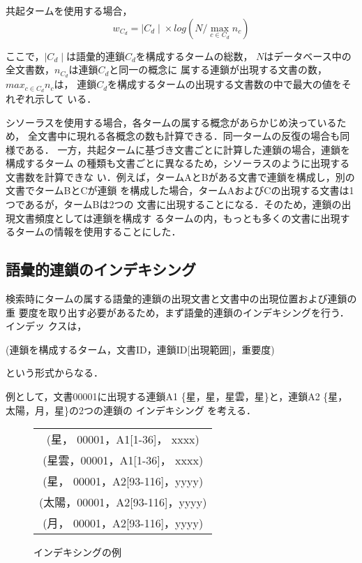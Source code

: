 共起タームを使用する場合，
\begin{equation}\label{equ:cweight_co}
w_{C_d} = {\mid C_{d}\mid}\times 
log(N/\max_{c \in C_{d}} n_{c})
\end{equation}

ここで，$\mid C_d\mid$は語彙的連鎖$C_{d}$を構成するタームの総数，
$N$はデータベース中の全文書数，$n_{C_{d}}$は連鎖$C_{d}$と同一の概念に
属する連鎖が出現する文書の数，$max_{c \in C_{d}} n_{c}$は，
連鎖$C_{d}$を構成するタームの出現する文書数の中で最大の値をそれぞれ示して
いる．

シソーラスを使用する場合，各タームの属する概念があらかじめ決っているため，
全文書中に現れる各概念の数も計算できる．同一タームの反復の場合も同様である．
一方，共起タームに基づき文書ごとに計算した連鎖の場合，連鎖を構成するターム
の種類も文書ごとに異なるため，シソーラスのように出現する文書数を計算できな
い．例えば，タームAとBがある文書で連鎖を構成し，別の文書でタームBとCが連鎖
を構成した場合，タームAおよびCの出現する文書は1つであるが，タームBは2つの
文書に出現することになる．そのため，連鎖の出現文書頻度としては連鎖を構成す
るタームの内，もっとも多くの文書に出現するタームの情報を使用することにした．

\subsection{語彙的連鎖のインデキシング}\label{ssec:lexindexing}
検索時にタームの属する語彙的連鎖の出現文書と文書中の出現位置および連鎖の重
要度を取り出す必要があるため，まず語彙的連鎖のインデキシングを行う．インデッ
クスは，

(連鎖を構成するターム，文書ID，連鎖ID[出現範囲]，重要度)

\noindent という形式からなる．

例として，文書00001に出現する連鎖A1 
\{星，星，星雲，星\}と，連鎖A2 
\{星，太陽，月，星\}の2つの連鎖の
インデキシング
を考える．


\begin{figure}[htbp]
\begin{center}
\begin{tabular}{|c|}\hline
(星，  00001，A1[1-36]，  xxxx)\\
(星雲，00001，A1[1-36]，  xxxx)\\
(星，  00001，A2[93-116]，yyyy)\\
(太陽，00001，A2[93-116]，yyyy)\\
(月，  00001，A2[93-116]，yyyy)\\\hline
\end{tabular}
\caption{インデキシングの例}\label{fig:index}
\end{center}
\end{figure}

